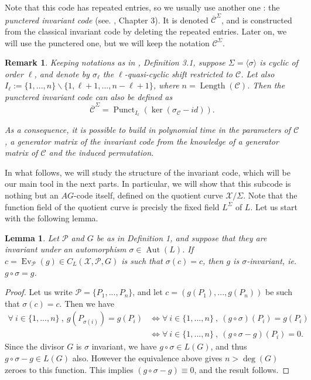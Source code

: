 \documentclass[10pt]{article}
\newtheorem{lem1}[thm]{Lemma}
\newtheorem{rq1}[thm]{Remark}
\newcommand{\s}{\vspace{0.3cm}}
\newcommand{\X}{\mathcal{X}}
\newcommand{\PR}{\mathcal{P}}
\newcommand{\Aut}{\operatorname{Aut}}
\begin{document}
Note that this code has repeated entries, so we usually use another one : the \emph{punctered invariant code} (see. \cite{Bar}, Chapter 3). It is denoted $\overline{\mathcal{C}}^{\Sigma}$, and is constructed from the classical invariant code by deleting the repeated entries. Later on, we will use the punctered one, but we will keep the notation $\mathcal{C}^{\Sigma}$. 

\s

\begin{rq1} \rm \label{gen inv}
Keeping notations as in \cite{Bar}, Definition 3.1, suppose $\Sigma = \langle \sigma \rangle$ is cyclic of order $\ell$, and denote by $\sigma_{\ell}$ the $\ell$-quasi-cyclic shift restricted to $\mathcal{C}$. Let also $I_{\ell} := \{1,...,n\}\backslash \{1,\ell+1,...,n-\ell+1\}$, where $n=\operatorname{Length}(\mathcal{C})$. Then the punctered invariant code can also be defined as
\[ \overline{\mathcal{C}}^{\Sigma} = \operatorname{Punct}_{ I_{\ell}}(\ker (\sigma_{\mathcal{C}}-id)).\]

\s

As a consequence, it is possible to build in polynomial time in the parameters of $\mathcal{C}$, a generator matrix of the invariant code from the knowledge of a generator matrix of $\mathcal{C}$ and the induced permutation. 
\end{rq1}


In what follows, we will study the structure of the invariant code, which will be our main tool in the next parts. In particular, we will show that this subcode is nothing but an $AG$-code itself, defined on the quotient curve $\X/\Sigma$. Note that the function field of the quotient curve is precisly the fixed field $L^{\Sigma}$ of $L$. Let us start with the following lemma.

\s

\begin{lem1} \label{inv}
Let $\PR$ and $G$ be as in Definition 1, and suppose that they are invariant under an automorphism $\sigma \in \Aut(L)$. If $c = \operatorname{Ev}_{\PR}(g) \in C_L(\X,\PR,G)$ is such that $\sigma(c) = c$, then $g$ is $\sigma$-invariant, ie. $g\circ \sigma = g$. 
\end{lem1}

\s

\begin{proof}
Let us write $\PR = \{P_1,...,P_n\}$, and let $c=(g(P_1),...,g(P_n))$ be such that $\sigma(c)=c$. Then we have 
\begin{align*}
\forall \ i \in \{1,...,n\} \ , \ g(P_{\sigma(i)}) = g(P_i) &\iff \forall \ i \in \{1,...,n\} \ , \ (g \circ \sigma)(P_i) =g(P_i) \\
& \iff \forall \ i \in \{1,...,n\} \ , \ (g\circ \sigma - g)(P_i) = 0.
\end{align*}
Since the divisor $G$ is $\sigma$ invariant, we have $g \circ \sigma \in L(G)$, and thus $g\circ \sigma - g \in L(G)$ also.
However the equivalence above gives $n>\deg(G)$ zeroes to this function. This implies $(g \circ \sigma - g) \equiv 0$, and the result follows.
\end{proof}
\end{document}
